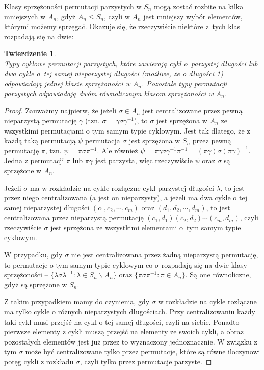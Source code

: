 \documentclass[licencjacka]{pracamgr}
\newtheorem{thh}{Twierdzenie}[section]
\begin{document}
Klasy sprzężoności permutacji parzystych w $S_n$ mogą zostać rozbite na kilka mniejszych w $A_n$, 
gdyż $A_n \le S_n$, czyli w $A_n$ jest mniejszy wybór elementów, którymi możemy sprzęgać.
Okazuje się, że rzeczywiście niektóre z~tych klas rozpadają się na dwie:

\begin{thh}\label{thm_o_klasach_A_n} $ $ \\
	Typy cyklowe permutacji parzystych, które zawierają cykl o~parzystej długości 
	lub dwa cykle o~tej samej nieparzystej długości (możliwe, że o długości 1)
	odpowiadają jednej klasie sprzężoności w $A_n$.
	Pozostałe typy permutacji parzystych odpowiadają dwóm równolicznym klasom sprzężoności w $A_n$.
\end{thh}
\begin{proof}
	Zauważmy najpierw, że jeżeli $\sigma \in A_n$ jest centralizowane przez pewną nieparzystą permutację $\gamma$ 
	(tzn. $\sigma = \gamma \sigma \gamma ^{-1}$), 
	to $\sigma$ jest sprzężona w $A_n$ ze wszystkimi permutacjami o tym samym typie cyklowym.
	Jest tak dlatego, że z każdą taką permutacją $\psi$ permutacja $\sigma$ jest sprzężona w $S_n$ przez pewną permutację $\pi$,
	tzn. $\psi = \pi \sigma \pi^{-1}$.
	Ale również $\psi = \pi \gamma \sigma \gamma^{-1} \pi^{-1} = (\pi \gamma) \sigma (\pi \gamma)^{-1}$.
	Jedna z permutacji $\pi$ lub $\pi \gamma$ jest parzysta, więc rzeczywiście $\psi$ oraz $\sigma$ są sprzężone w $A_n$.

	Jeżeli $\sigma$ ma w rozkładzie na cykle rozłączne cykl parzystej długości $\lambda$, 
	to jest przez niego centralizowana (a jest on nieparzysty),
	a jeżeli ma dwa cykle o tej samej nieparzystej długości $(c_1, c_2, \cdots, c_m)$ oraz $(d_1, d_2, \cdots, d_m)$, 
	to jest centralizowana przez nieparzystą permutację $(c_1, d_1)(c_2, d_2) \cdots (c_m, d_m)$,
	czyli rzeczywiście $\sigma$ jest sprzężona ze wszystkimi elementami o~tym samym typie cyklowym.

	W przypadku, gdy $\sigma$ nie jest centralizowana przez żadną nieparzystą permutację,
	to permutacje o tym samym typie cyklowym co $\sigma$ rozpadają się na dwie klasy sprzężoności --
	$\{\lambda \sigma \lambda^{-1} \colon \lambda \in S_n \backslash A_n \}$ oraz
	$\{\pi \sigma \pi^{-1} \colon \pi \in  A_n \}$.
	Są one równoliczne, gdyż są sprzężone w $S_n$.

	Z takim przypadkiem mamy do czynienia, gdy $\sigma$ w rozkładzie na cykle rozłączne 
	ma tylko cykle o różnych nieparzystych długościach.
	Przy centralizowaniu każdy taki cykl musi przejść na cykl o tej samej długości, czyli na siebie.
	Ponadto pierwsze elementy z cykli muszą przejść na elementy ze swoich cykli, 
	a obraz pozostałych elementów jest już przez to wyznaczony jednoznacznie.
	W związku z tym $\sigma$ może być centralizowane tylko przez permutacje, 
	które są równe iloczynowi potęg cykli z rozkładu $\sigma$, 
	czyli tylko przez permutacje parzyste.
\end{proof}
\end{document}
